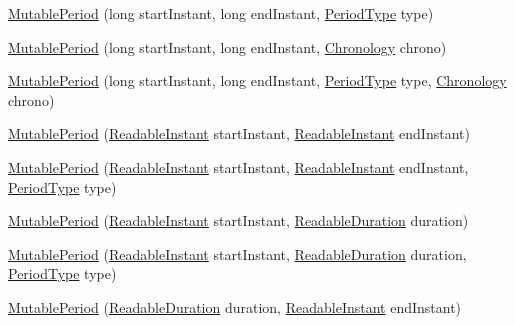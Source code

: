 \begin{DoxyCompactItemize}
\hyperlink{classorg_1_1joda_1_1time_1_1_mutable_period_aa418bf1b996aed944b10f0e587a9c2df}{Mutable\-Period} (long start\-Instant, long end\-Instant, \hyperlink{classorg_1_1joda_1_1time_1_1_period_type}{Period\-Type} type)
\item 
\hyperlink{classorg_1_1joda_1_1time_1_1_mutable_period_aa762eda71a6f3f133280169dbe032487}{Mutable\-Period} (long start\-Instant, long end\-Instant, \hyperlink{classorg_1_1joda_1_1time_1_1_chronology}{Chronology} chrono)
\item 
\hyperlink{classorg_1_1joda_1_1time_1_1_mutable_period_a92e90341f4e5d7bc2ccc0843e31224ba}{Mutable\-Period} (long start\-Instant, long end\-Instant, \hyperlink{classorg_1_1joda_1_1time_1_1_period_type}{Period\-Type} type, \hyperlink{classorg_1_1joda_1_1time_1_1_chronology}{Chronology} chrono)
\item 
\hyperlink{classorg_1_1joda_1_1time_1_1_mutable_period_adb71939c050366f895533dcb83f71947}{Mutable\-Period} (\hyperlink{interfaceorg_1_1joda_1_1time_1_1_readable_instant}{Readable\-Instant} start\-Instant, \hyperlink{interfaceorg_1_1joda_1_1time_1_1_readable_instant}{Readable\-Instant} end\-Instant)
\item 
\hyperlink{classorg_1_1joda_1_1time_1_1_mutable_period_a2e7afa390c86eae8e54055fd4745e4a4}{Mutable\-Period} (\hyperlink{interfaceorg_1_1joda_1_1time_1_1_readable_instant}{Readable\-Instant} start\-Instant, \hyperlink{interfaceorg_1_1joda_1_1time_1_1_readable_instant}{Readable\-Instant} end\-Instant, \hyperlink{classorg_1_1joda_1_1time_1_1_period_type}{Period\-Type} type)
\item 
\hyperlink{classorg_1_1joda_1_1time_1_1_mutable_period_ab47e3aaa06c2d22fe311e36b52656ede}{Mutable\-Period} (\hyperlink{interfaceorg_1_1joda_1_1time_1_1_readable_instant}{Readable\-Instant} start\-Instant, \hyperlink{interfaceorg_1_1joda_1_1time_1_1_readable_duration}{Readable\-Duration} duration)
\item 
\hyperlink{classorg_1_1joda_1_1time_1_1_mutable_period_adba3e35a0fd9dda13816c8863ed218e6}{Mutable\-Period} (\hyperlink{interfaceorg_1_1joda_1_1time_1_1_readable_instant}{Readable\-Instant} start\-Instant, \hyperlink{interfaceorg_1_1joda_1_1time_1_1_readable_duration}{Readable\-Duration} duration, \hyperlink{classorg_1_1joda_1_1time_1_1_period_type}{Period\-Type} type)
\item 
\hyperlink{classorg_1_1joda_1_1time_1_1_mutable_period_a095b03dfce5cd9c40ebe29b6b2937ee6}{Mutable\-Period} (\hyperlink{interfaceorg_1_1joda_1_1time_1_1_readable_duration}{Readable\-Duration} duration, \hyperlink{interfaceorg_1_1joda_1_1time_1_1_readable_instant}{Readable\-Instant} end\-Instant)

\end{DoxyCompactItemize}
